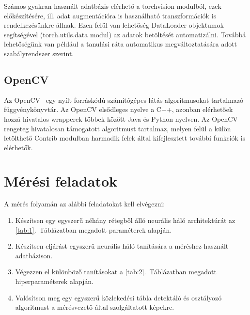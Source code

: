 \documentclass[12pt,a4paper,oneside]{report}             %
\begin{document}
Számos gyakran használt adatbázis elérhető a torchvision modulból, ezek előkészítésére, ill. adat augmentációra is használható transzformációk is rendelkezésünkre állnak. Ezen felül van lehetőség DataLoader objektumok segítségével (torch.utils.data modul) az adatok betöltését automatizálni. Továbbá lehetőségünk van például a tanulási ráta automatikus megváltoztatására adott szabályrendszer szerint.

\section{OpenCV}

Az OpenCV~\cite{opencv} egy nyílt forráskódú számítógépes látás algoritmusokat tartalmazó függvénykönyvtár. Az OpenCV elsődleges nyelve a C++, azonban elérhetőek hozzá hivatalos wrapperek többek között Java és Python nyelven. Az OpenCV rengeteg hivatalosan támogatott algoritmust tartalmaz, melyen felül a külön letölthető Contrib modulban harmadik felek által kifejlesztett további funkciók is elérhetők.

\chapter{Mérési feladatok}

A mérés folyamán az alábbi feladatokat kell elvégezni:

\begin{enumerate}
\item Készítsen egy egyszerű néhány rétegből álló neurális háló architektúrát az \ref{tab:1}.~Táblázatban megadott paraméterek alapján.
\item Készítsen eljárást egyszerű neurális háló tanítására a méréshez használt adatbázison.
\item Végezzen el különböző tanításokat a \ref{tab:2}.~Táblázatban megadott hiperparaméterek alapján.
\item Valósítson meg egy egyszerű közlekedési tábla detektáló és osztályozó algoritmust a mérésvezető által szolgáltatott képekre.
\end{enumerate}
\end{document}
